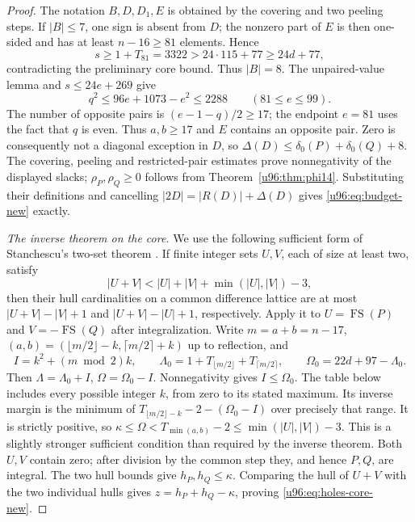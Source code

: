 \documentclass[11pt,a4paper]{article}
\theoremstyle{remark}
\newcommand{\FS}{\operatorname{FS}}
\begin{document}
\begin{proof}
The notation $B,D,D_1,E$ is obtained by the covering and two peeling
steps. If $|B|\leq7$, one sign is absent from $D$; the nonzero part of
$E$ is then one-sided and has at least $n-16\geq81$ elements. Hence
\[
 s\geq1+T_{81}=3322>24\cdot115+77\geq24d+77,
\]
contradicting the preliminary core bound. Thus $|B|=8$.
The unpaired-value lemma and $s\leq24e+269$ give
\[
 q^2\leq96e+1073-e^2\leq2288\qquad(81\leq e\leq99).
\]
The number of opposite pairs is $(e-1-q)/2\geq17$; the endpoint $e=81$
uses the fact that $q$ is even. Thus $a,b\geq17$ and $E$ contains an
opposite pair. Zero is consequently not a diagonal exception in $D$,
so $\Delta(D)\leq\delta_0(P)+\delta_0(Q)+8$.
The covering, peeling and restricted-pair estimates prove nonnegativity
of the displayed slacks; $\rho_P,\rho_Q\geq0$ follows from
Theorem~\ref{u96:thm:phi14}. Substituting their definitions and cancelling
$|2D|=|R(D)|+\Delta(D)$ gives \eqref{u96:eq:budget-new} exactly.

\emph{The inverse theorem on the core.}
We use the following sufficient form of Stanchescu's two-set theorem
\cite[Corollary~2]{Stanchescu1996}. If finite integer sets $U,V$, each
of size at least two, satisfy
\[
 |U+V|<|U|+|V|+\min(|U|,|V|)-3,
\]
then their hull cardinalities on a common difference lattice are at most
$|U+V|-|V|+1$ and $|U+V|-|U|+1$, respectively.
Apply it to $U=\FS(P)$ and $V=-\FS(Q)$ after integralization.
Write $m=a+b=n-17$, $(a,b)=(\lfloor m/2\rfloor-k,
\lceil m/2\rceil+k)$ up to reflection, and
\[
 I=k^2+(m\bmod2)k,\qquad
 \Lambda_0=1+T_{\lfloor m/2\rfloor}+T_{\lceil m/2\rceil},
 \qquad\Omega_0=22d+97-\Lambda_0.
\]
Then $\Lambda=\Lambda_0+I$, $\Omega=\Omega_0-I$.
Nonnegativity gives $I\leq\Omega_0$. The table below includes every
possible integer $k$, from zero to its stated maximum. Its inverse
margin is the minimum of $T_{\lfloor m/2\rfloor-k}-2-(\Omega_0-I)$
over precisely that range. It is strictly positive, so
$\kappa\leq\Omega<T_{\min(a,b)}-2\leq\min(|U|,|V|)-3$.
This is a slightly stronger sufficient condition than required by the
inverse theorem. Both $U,V$ contain zero; after division by the common
step they, and hence $P,Q$, are integral. The two hull bounds give
$h_P,h_Q\leq\kappa$. Comparing the hull of $U+V$ with the two individual
hulls gives $z=h_P+h_Q-\kappa$, proving \eqref{u96:eq:holes-core-new}.


\end{proof}
\end{document}
